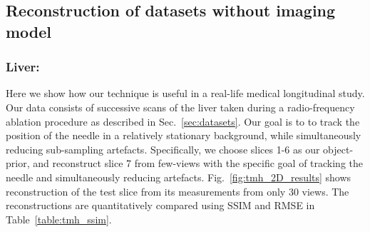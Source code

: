 \documentclass[journal]{IEEEtran}
\begin{document}
\subsection{Reconstruction of datasets without imaging model}
\subsubsection{\textbf{Liver:}}
\label{sec:tmh}

Here we show how our technique is useful in a
real-life medical longitudinal study. Our data consists of
successive scans of the liver taken during a radio-frequency ablation
procedure as described in Sec.~\ref{sec:datasets}. Our goal is to to
track the position of the needle in a relatively stationary
background, while simultaneously reducing sub-sampling artefacts.
Specifically, we choose slices 1-6 as our object-prior, and
reconstruct slice 7 from few-views with the specific goal of tracking
the needle and simultaneously reducing
artefacts. Fig.~\ref{fig:tmh_2D_results} 
shows reconstruction of the test
slice from its measurements from only 30 views. The reconstructions are quantitatively compared using
SSIM and RMSE in Table~\ref{table:tmh_ssim}.
\end{document}
